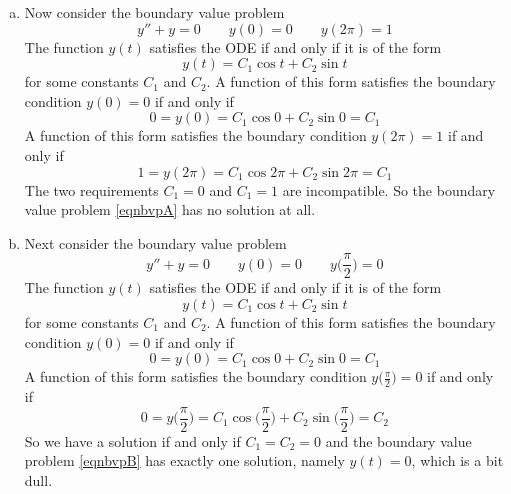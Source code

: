 \begin{eg}
\begin{enumerate}[(a)]
\item
Now consider the boundary value problem
\begin{equation}\label{eqnbvpA}
y''+y=0\qquad y(0)=0\qquad y(2\pi)=1
\end{equation}
The function $y(t)$ satisfies the ODE if and only if it is of the form
\begin{equation*}
y(t)=C_1\cos t+C_2\sin t
\end{equation*}
for some constants $C_1$ and $C_2$. A function 
of this form satisfies the boundary condition $y(0)=0$ if and only if
\begin{equation*}
0=y(0)= C_1\cos 0+C_2\sin 0 =C_1
\end{equation*}
A function of this form satisfies the boundary condition $y(2\pi)=1$ if and 
only if
\begin{equation*}
1=y(2\pi)= C_1\cos 2\pi+C_2\sin 2\pi =C_1
\end{equation*}
The two requirements $C_1=0$ and $C_1=1$ are incompatible. So the boundary
value problem \eqref{eqnbvpA} has no solution at all.

\item
Next consider the boundary value problem
\begin{equation}\label{eqnbvpB}
y''+y=0\qquad y(0)=0\qquad y\Big(\frac{\pi}{2}\Big)=0
\end{equation}
The function $y(t)$ satisfies the ODE if and only if it is of the form
\begin{equation*}
y(t)=C_1\cos t+C_2\sin t
\end{equation*} 
for some constants $C_1$ and $C_2$. A function 
of this form satisfies the boundary condition $y(0)=0$ if and only if
\begin{equation*}
0=y(0)= C_1\cos 0+C_2\sin 0 =C_1
\end{equation*}
A function of this form satisfies the boundary condition 
$y\big(\frac{\pi}{2}\big)=0$ if and  only if
\begin{equation*}
0=y\Big(\frac{\pi}{2}\Big)
 = C_1\cos \Big(\frac{\pi}{2}\Big)+C_2\sin\Big(\frac{\pi}{2}\Big) =C_2
\end{equation*}
So we have a solution if and only if $C_1=C_2=0$ and
the boundary value problem \eqref{eqnbvpB} has exactly one solution, namely $y(t)=0$, which is a bit dull.


\end{enumerate}
\end{eg}
